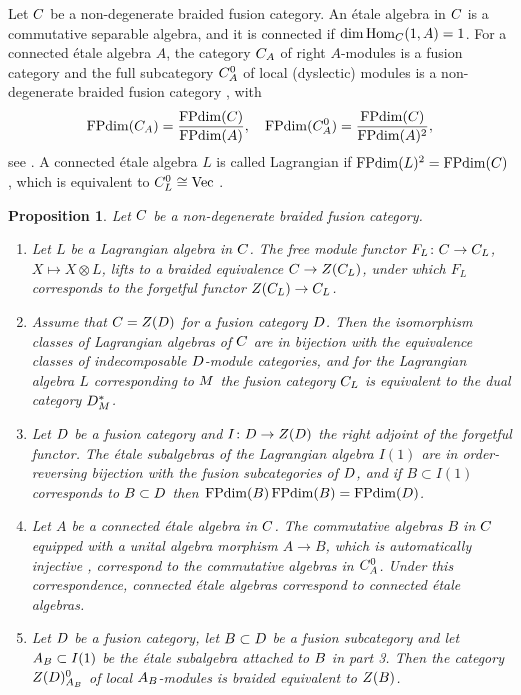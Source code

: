 \documentclass[leqno]{article}
\let\cal\relax
\newcommand{\cal}{\mathcal}
\newcommand{\co}{\colon}
\newcommand{\ot}{\otimes}
\newtheorem{prop}[thm]{Proposition}
\numberwithin{equation}{section}
\begin{document}
Let $\cal C$ be a non-degenerate braided fusion category. An \'etale algebra in $\cal C$ is a commutative separable algebra, and it is connected if $\dim \operatorname{Hom}_{\cal C}(1,A) = 1$. For a connected \'etale algebra $A$, the category $\cal C_A$ of right $A$-modules is a fusion category and the full subcategory $\cal C_A^0$ of local (dyslectic) modules is a non-degenerate braided fusion category \cite[Corollary 3.30 p.~15]{DMNO13}, with
\begin{equation}
\label{eq:dims-local}
\operatorname{FPdim}(\cal C_A) = \frac{\operatorname{FPdim}(\cal C)}{\operatorname{FPdim}(A)},\quad \operatorname{FPdim}(\cal C_A^0) = \frac{\operatorname{FPdim}(\cal C)}{\operatorname{FPdim}(A)^2},
\end{equation}
see \cite[Lemma 3.11 p.~10 and Corollary 3.32 p.~15]{DMNO13}. A connected \'etale algebra $L$ is called Lagrangian if $\operatorname{FPdim}(L)^2 = \operatorname{FPdim}(\cal C)$ \cite[Definition 4.6 p.~17]{DMNO13}, which is equivalent to $\cal C_L^0 \cong \mathrm{Vec}$ \cite[Remark 4.3 p.~16]{DMNO13}.

\begin{prop}
\label{prop:DMNO}
Let $\cal C$ be a non-degenerate braided fusion category.
\begin{enumerate}
\item Let $L$ be a Lagrangian algebra in $\cal C$. The free module functor $F_L \co \cal C \to \cal C_L$, $X \mapsto X \ot L$, lifts to a braided equivalence $\cal C \to Z(\cal C_L)$, under which $F_L$ corresponds to the forgetful functor $Z(\cal C_L) \to \cal C_L$.
\item Assume that $\cal C = Z(\cal D)$ for a fusion category $\cal D$. Then the isomorphism classes of Lagrangian algebras of $\cal C$ are in bijection with the equivalence classes of indecomposable $\cal D$-module categories, and for the Lagrangian algebra $L$ corresponding to $\cal M$ the fusion category $\cal C_L$ is equivalent to the dual category $\cal D^*_{\cal M}$.
\item Let $\cal D$ be a fusion category and $I \co \cal D \to Z(\cal D)$ the right adjoint of the forgetful functor. The \'etale subalgebras of the Lagrangian algebra $I(1)$ are in order-reversing bijection with the fusion subcategories of $\cal D$, and if $B \subset I(1)$ corresponds to $\cal B \subset \cal D$ then $\operatorname{FPdim}(B)\operatorname{FPdim}(\cal B) = \operatorname{FPdim}(\cal D)$.
\item Let $A$ be a connected \'etale algebra in $\cal C$. The commutative algebras $B$ in $\cal C$ equipped with a unital algebra morphism $A \to B$, which is automatically injective \cite[p.~12]{DMNO13}, correspond to the commutative algebras in $\cal C_A^0$. Under this correspondence, connected \'etale algebras correspond to connected \'etale algebras.
\item Let $\cal D$ be a fusion category, let $\cal B \subset \cal D$ be a fusion subcategory and let $A_{\cal B} \subset I(1)$ be the \'etale subalgebra attached to $\cal B$ in part 3. Then the category $Z(\cal D)^0_{A_{\cal B}}$ of local $A_{\cal B}$-modules is braided equivalent to $Z(\cal B)$.
\end{enumerate}
\end{prop}
\end{document}
